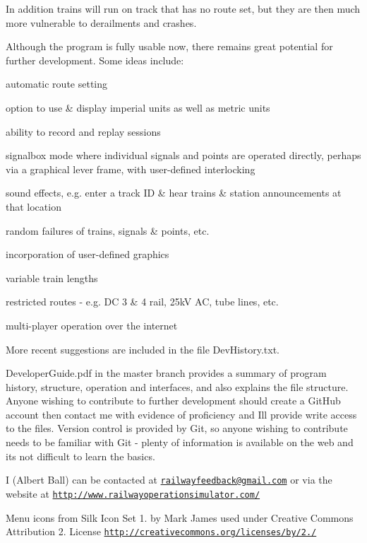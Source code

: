In addition trains will run on track that has no route set, but they are then much more vulnerable to derailments and crashes.

Although the program is fully usable now, there remains great potential for further development. Some ideas include\+:


\begin{DoxyItemize}
\item automatic route setting
\item option to use \& display imperial units as well as metric units
\item ability to record and replay sessions
\item signalbox mode where individual signals and points are operated directly, perhaps via a graphical lever frame, with user-\/defined interlocking
\item sound effects, e.\+g. enter a track ID \& hear trains \& station announcements at that location
\item random failures of trains, signals \& points, etc.
\item incorporation of user-\/defined graphics
\item variable train lengths
\item restricted routes -\/ e.\+g. DC 3 \& 4 rail, 25kV AC, tube lines, etc.
\item multi-\/player operation over the internet
\end{DoxyItemize}

More recent suggestions are included in the file Dev\+History.\+txt.

\textquotesingle{}Developer\+Guide.\+pdf\textquotesingle{} in the \textquotesingle{}master\textquotesingle{} branch provides a summary of program history, structure, operation and interfaces, and also explains the file structure. Anyone wishing to contribute to further development should create a Git\+Hub account then contact me with evidence of proficiency and I\textquotesingle{}ll provide write access to the files. Version control is provided by \textquotesingle{}Git\textquotesingle{}, so anyone wishing to contribute needs to be familiar with \textquotesingle{}Git\textquotesingle{} -\/ plenty of information is available on the web and it\textquotesingle{}s not difficult to learn the basics.

I (Albert Ball) can be contacted at \href{mailto:railwayfeedback@gmail.com}{\tt railwayfeedback@gmail.\+com} or via the website at \href{http://www.railwayoperationsimulator.com/}{\tt http\+://www.\+railwayoperationsimulator.\+com/}

Menu icons from Silk Icon Set 1. by Mark James used under Creative Commons Attribution 2. License \href{http://creativecommons.org/licenses/by/2.5/}{\tt http\+://creativecommons.\+org/licenses/by/2./} 